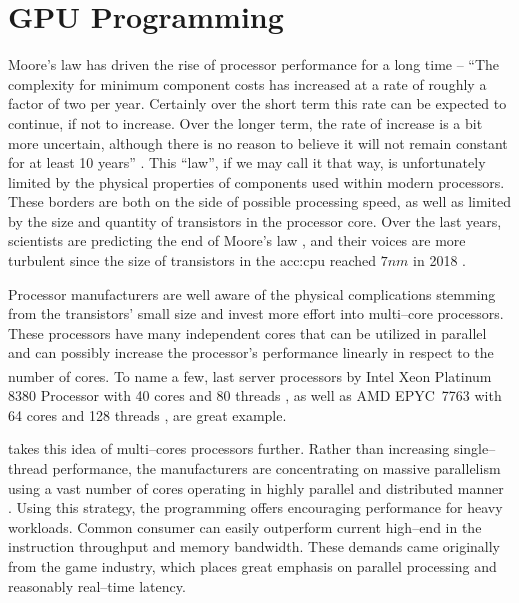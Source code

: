 \chapter{GPU Programming}
Moore's law has driven the rise of processor performance for a long time -- \enquote{The complexity for minimum component costs has increased at a rate of roughly a factor of two per year. Certainly over the short term this rate can be expected to continue, if not to increase. Over the longer term, the rate of increase is a bit more uncertain, although there is no reason to believe it will not remain constant for at least 10 years} \citep{MooresLaw}. This \enquote{law}, if we may call it that way, is unfortunately limited by the physical properties of components used within modern processors. These borders are both on the side of possible processing speed, as well as limited by the size and quantity of transistors in the processor core. Over the last years, scientists are predicting the end of Moore's law \citep{MooresLawEnd}, and their voices are more turbulent since the size of transistors in the \acrfull{acc:cpu} reached $7nm$ in 2018 \citep{SamsungSevenNm}. 

Processor manufacturers are well aware of the physical complications stemming from the transistors' small size and invest more effort into multi--core processors. These processors have many independent cores that can be utilized in parallel and can possibly increase the processor's performance linearly in respect to the number of cores. To name a few, last server processors by Intel\textsuperscript{\textregistered} Xeon\textsuperscript{\textregistered} Platinum 8380 Processor with 40 cores and 80 threads \citep{IntelXeonPlatinum}, as well as AMD EPYC\texttrademark\ 7763 with 64 cores and 128 threads \citep{AMDEpyc}, are great example.

 takes this idea of multi--cores processors further. Rather than increasing single--thread performance, the \gpu manufacturers are concentrating on massive parallelism using a vast number of cores operating in highly parallel and distributed manner \citep{GPUComputingOwens}. Using this strategy, the \gpu programming offers encouraging performance for heavy workloads. Common consumer  can easily outperform current high--end  in the instruction throughput and memory bandwidth. These demands came originally from the game industry, which places great emphasis on parallel processing and reasonably real--time latency.

